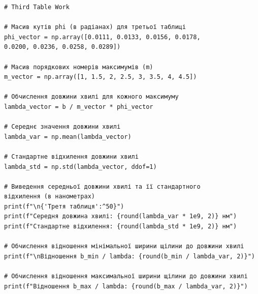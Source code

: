 \documentclass[12pt,a4paper]{article}
\begin{document}
{\begin{verbatim}
# Third Table Work

# Масив кутів phi (в радіанах) для третьої таблиці
phi_vector = np.array([0.0111, 0.0133, 0.0156, 0.0178,
0.0200, 0.0236, 0.0258, 0.0289])

# Масив порядкових номерів максимумів (m)
m_vector = np.array([1, 1.5, 2, 2.5, 3, 3.5, 4, 4.5])

# Обчислення довжини хвилі для кожного максимуму
lambda_vector = b / m_vector * phi_vector

# Середнє значення довжини хвилі
lambda_var = np.mean(lambda_vector)

# Стандартне відхилення довжини хвилі
lambda_std = np.std(lambda_vector, ddof=1)

# Виведення середньої довжини хвилі та її стандартного
відхилення (в нанометрах)
print(f"\n{'Третя таблиця':^50}")
print(f"Середня довжина хвилі: {round(lambda_var * 1e9, 2)} нм")
print(f"Стандартне відхилення: {round(lambda_std * 1e9, 2)} нм")

# Обчислення відношення мінімальної ширини щілини до довжини хвилі
print(f"\nВідношення b_min / lambda: {round(b_min / lambda_var, 2)}")

# Обчислення відношення максимальної ширини щілини до довжини хвилі
print(f"Відношення b_max / lambda: {round(b_max / lambda_var, 2)}")
\end{verbatim}
}
\end{document}
